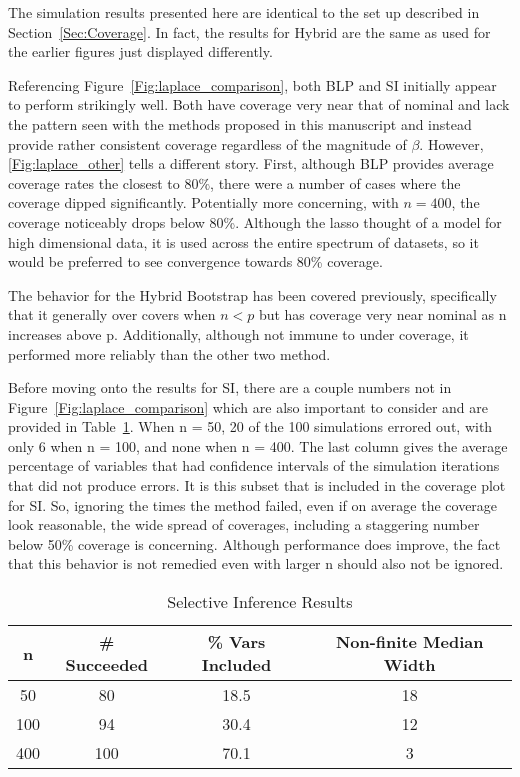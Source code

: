 The simulation results presented here are identical to the set up described in Section~\ref{Sec:Coverage}. In fact, the results for Hybrid are the same as used for the earlier figures just displayed differently. 

Referencing Figure~\ref{Fig:laplace_comparison}, both BLP and SI initially appear to perform strikingly well. Both have coverage very near that of nominal and lack the pattern seen with the methods proposed in this manuscript and instead provide rather consistent coverage regardless of the magnitude of $\beta$. However, \ref{Fig:laplace_other} tells a different story. First, although BLP provides average coverage rates the closest to $80\%$, there were a number of cases where the coverage dipped significantly. Potentially more concerning, with $n = 400$, the coverage noticeably drops below 80\%. Although the lasso thought of a model for high dimensional data, it is used across the entire spectrum of datasets, so it would be preferred to see convergence towards 80\% coverage.

The behavior for the Hybrid Bootstrap has been covered previously, specifically that it generally over covers when $n < p$ but has coverage very near nominal as n increases above p. Additionally, although not immune to under coverage, it performed more reliably than the other two method.

Before moving onto the results for SI, there are a couple numbers not in Figure~\ref{Fig:laplace_comparison} which are also important to consider and are provided in Table~\ref{Tab:selective_inference}. When n = 50, 20 of the 100 simulations errored out, with only 6 when n = 100, and none when n = 400. The last column gives the average percentage of variables that had confidence intervals of the simulation iterations that did not produce errors. It is this subset that is included in the coverage plot for SI. So, ignoring the times the method failed, even if on average the coverage look reasonable, the wide spread of coverages, including a staggering number below 50\% coverage is concerning. Although performance does improve, the fact that this behavior is not remedied even with larger n should also not be ignored.

\begin{table}[ht]
  \centering
  \begin{tabular}{cccc}
  \hline
  n & \# Succeeded & \% Vars Included & Non-finite Median Width \\
  \hline
  50  & 80  & 18.5 & 18 \\
  100 & 94  & 30.4 & 12 \\
  400 & 100 & 70.1 & 3 \\
  \hline
  \end{tabular}
  \caption{Selective Inference Results}
  \label{Tab:selective_inference}
\end{table}

